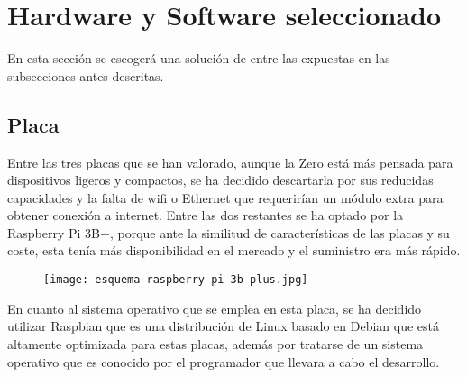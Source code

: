 \section{Hardware y Software seleccionado}\label{sec:hardwareSoftware}
En esta sección se escogerá una solución de entre las expuestas en las subsecciones antes descritas.

\subsection{Placa}\label{subsec:placa}
Entre las tres placas que se han valorado, aunque la Zero está más pensada para dispositivos ligeros y compactos, se ha decidido descartarla por sus reducidas capacidades y la falta de wifi o Ethernet que requerirían un módulo extra para obtener conexión a internet. Entre las dos restantes se ha optado por la Raspberry Pi 3B+, porque ante la similitud de características de las placas y su coste, esta tenía más disponibilidad en el mercado y el suministro era más rápido.
\begin{figure}[H]
	{\texttt{[image: esquema-raspberry-pi-3b-plus.jpg]}}\label{fig:esquemaRaspberry3B}
\end{figure}
En cuanto al sistema operativo que se emplea en esta placa, se ha decidido utilizar Raspbian que es una distribución de Linux basado en Debian que está altamente optimizada para estas placas, además por tratarse de un sistema operativo que es conocido por el programador que llevara a cabo el desarrollo.

